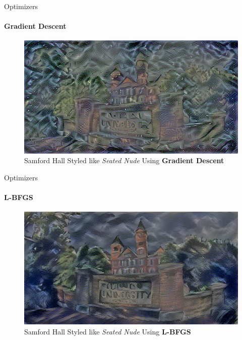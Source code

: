 \documentclass{beamer}
\begin{document}
\begin{frame}{Optimizers}
\framesubtitle{Gradient Descent}
\begin{figure}[ht]
\centering
\includegraphics[width=\textwidth]{img/loss/SGD}
\caption*{Samford Hall Styled like \textit{Seated Nude} Using \textbf{Gradient Descent}}
\end{figure}
\end{frame}



\begin{frame}{Optimizers}
\framesubtitle{L-BFGS}
\begin{figure}[ht]
\centering
\includegraphics[width=\textwidth]{img/loss/L_BFGS}
\caption*{Samford Hall Styled like \textit{Seated Nude} Using \textbf{L-BFGS}}
\end{figure}
\end{frame}
\end{document}
